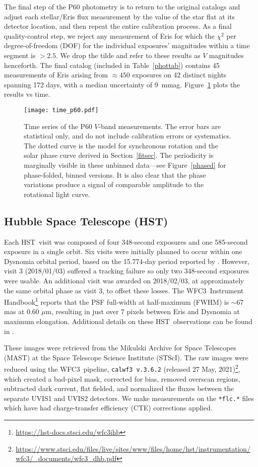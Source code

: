 \documentclass[onecolumn]{aastex631}
\newcommand{\hst}{HST}
\newcommand{\wfc}{WFC3}
\begin{document}
The final step of the P60 photometry is to return to the original catalogs and adjust each stellar/Eris flux measurement by the value of the star flat at its detector location, and then repeat the entire calibration process. As a final quality-control step, we reject any measurement of Eris for which the $\chi^2$ per degree-of-freedom (DOF) for the individual exposures' magnitudes within a time segment is $>2.5.$ We drop the tilde and refer to these results as $V$ magnitudes henceforth. The final catalog (included in Table~\ref{phottab}) contains 45 measurements of Eris arising from $\approx450$ exposures on 42 distinct nights spanning 172 days, with a median uncertainty of 9~mmag. Figure~\ref{p60time} plots the results vs time.

\begin{figure}
  \centering
  \texttt{[image: time\_p60.pdf]}
\caption{Time series of the P60 $V$-band measurements. The error bars are statistical only, and do not include calibration errors or systematics. The dotted curve is the model for synchronous rotation and the solar phase curve derived in Section~\ref{fitsec}. The periodicity is marginally visible in these unbinned data---see Figure~\ref{phased} for phase-folded, binned versions.  It is also clear that the phase variations produce a signal of comparable amplitude to the rotational light curve.}
\label{p60time}
\end{figure}

\subsection{Hubble Space Telescope (HST)}
Each \hst\ visit was composed of four 348-second exposures and one 585-second exposure in a single orbit. Six visits were initially planned to occur within one Dysnomia orbital period, based on the 15.774-day period reported by \citet{BS2007}. However, visit 3 (2018/01/03) suffered a tracking failure so only two 348-second exposures were usable. An additional visit was awarded on 2018/02/03, at approximately the same orbital phase as visit 3, to offset these losses. The \wfc\ Instrument Handbook\footnote{\url{https://hst-docs.stsci.edu/wfc3ihb}} reports that the PSF full-width at half-maximum (FWHM) is $\sim$67 mas at 0.60 $\mu$m, resulting in just over 7 pixels between Eris and Dysnomia at maximum elongation. Additional details on these \hst\ observations can be found in \citet{H21}.
  
These images were retrieved from the Mikulski Archive for Space Telescopes (MAST) at the Space Telescope Science Institute (STScI). The raw images were reduced using the \wfc\ pipeline, \texttt{calwf3 v.3.6.2} (released 27 May, 2021)\footnote{\url{https://www.stsci.edu/files/live/sites/www/files/home/hst/instrumentation/wfc3/_documents/wfc3_dhb.pdf}}, which created a bad-pixel mask, corrected for bias, removed overscan regions, subtracted dark current, flat fielded, and normalized the fluxes between the separate UVIS1 and UVIS2 detectors. We make measurements on the \texttt{*flc.*} files which have had charge-transfer efficiency (CTE) corrections applied.
\end{document}
